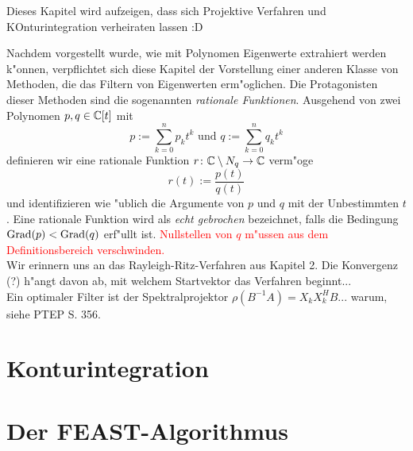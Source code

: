 Dieses Kapitel wird aufzeigen, dass sich Projektive Verfahren und KOnturintegration
verheiraten lassen :D

Nachdem vorgestellt wurde, wie mit Polynomen Eigenwerte extrahiert werden k"onnen,
verpflichtet sich diese Kapitel der Vorstellung einer anderen Klasse von Methoden, die
das Filtern von Eigenwerten erm"oglichen. Die Protagonisten dieser Methoden sind
die sogenannten \emph{rationale Funktionen}. Ausgehend
von zwei Polynomen $p, q\in\mathbb{C} [t]$ mit
\[
p := \sum_{k=0}^n p_k t^k \text{ \ und\ } q := \sum_{k=0}^n q_k t^k
\]
definieren wir eine rationale Funktion $r\colon\mathbb{C}\setminus{N_q}\to\mathbb{C}$ verm"oge
\[
r(t) := \frac{p(t)}{q(t)}
\]
und identifizieren wie "ublich die Argumente von $p$ und $q$ mit der Unbestimmten $t$.
Eine rationale Funktion wird als \emph{echt gebrochen} bezeichnet, falls die
Bedingung $\operatorname{Grad}(p) < \operatorname{Grad}(q)$ erf"ullt ist.
\textcolor{red}{Nullstellen von $q$ m"ussen aus dem Definitionsbereich verschwinden.}\\

Wir erinnern uns an das Rayleigh-Ritz-Verfahren aus Kapitel 2. Die Konvergenz (?)
h"angt davon ab, mit welchem Startvektor das Verfahren beginnt...\\

Ein optimaler Filter ist der Spektralprojektor $\rho(B^{-1}A) = X_k X_k^H B$... warum, siehe PTEP S. 356.

\section{Konturintegration}

\section{Der FEAST-Algorithmus}
